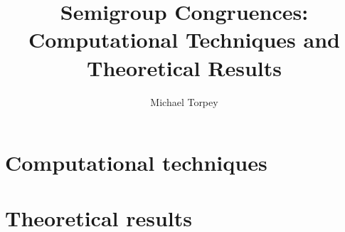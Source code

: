 \documentclass[a4paper]{report}
\title{Semigroup Congruences:\\
       Computational Techniques and Theoretical Results}
\author{Michael Torpey}
\theoremstyle{definition}
\begin{document}
 \null \newpage
 \null \newpage

\doublespacing



\singlespacing
\tableofcontents
\listoffigures
\doublespacing






\part{Computational techniques}
\label{part:algorithms}




\part{Theoretical results}
\label{part:results}



\singlespacing



\singlespacing
\printnomenclature
\clearpage
{}
\printindex
\doublespacing
\end{document}
